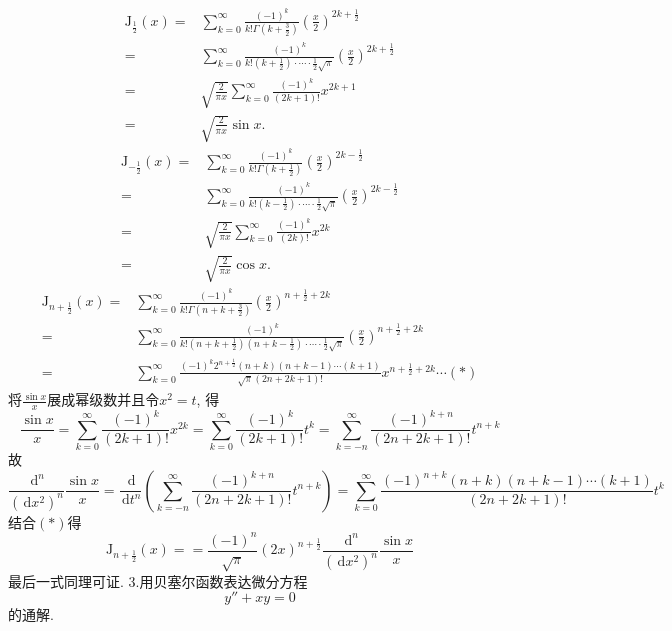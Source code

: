 \documentclass[titlepage,11pt,a4paper,twoside]{report}
\makeatletter
\newcommand\diff{\,\mathrm{d}}
\newcommand\rmJ{\mathrm{J}}
\renewenvironment{proof}{\par
	\pushQED{\qed}%
	\normalfont \topsep1\p@\@plus6\p@\relax
	\trivlist
	\item\relax
	{\hspace*{\parindent}{\heiti 证明}\@addpunct{:}}\hspace\labelsep\ignorespaces
}{%
	\popQED\endtrivlist\@endpefalse
}
\makeatother
\begin{document}
\begin{proof}\[\begin{split}
\rmJ_{\frac{1}{2}}(x)=&\sum_{k=0}^{\infty}\frac{(-1)^k}{k!\Gamma\left(k+\frac{3}{2}\right)}\left(\frac{x}{2}\right)^{2k+\frac{1}{2}}\\
=&\sum_{k=0}^{\infty}\frac{(-1)^k}{k!\left(k+\frac{1}{2}\right)\cdot\cdots\cdot\frac{1}{2}\sqrt{\pi}}\left(\frac{x}{2}\right)^{2k+\frac{1}{2}}\\
=&\sqrt{\frac{2}{\pi x}}\sum_{k=0}^{\infty}\frac{(-1)^k}{(2k+1)!}x^{2k+1}\\
=&\sqrt{\frac{2}{\pi x}}\sin x.
\end{split}\]
\[\begin{split}\rmJ_{-\frac{1}{2}}(x)=&\sum_{k=0}^{\infty}\frac{(-1)^k}{k!\Gamma\left(k+\frac{1}{2}\right)}\left(\frac{x}{2}\right)^{2k-\frac{1}{2}}\\
=&\sum_{k=0}^{\infty}\frac{(-1)^k}{k!\left(k-\frac{1}{2}\right)\cdot\cdots\cdot\frac{1}{2}\sqrt{\pi}}\left(\frac{x}{2}\right)^{2k-\frac{1}{2}}\\
=&\sqrt{\frac{2}{\pi x}}\sum_{k=0}^{\infty}\frac{(-1)^k}{(2k)!}x^{2k}\\
=&\sqrt{\frac{2}{\pi x}}\cos x.
\end{split}\]
\[\begin{split}
\rmJ_{n+\frac{1}{2}}(x)=&\sum_{k=0}^{\infty}\frac{(-1)^k}{k!\Gamma\left(n+k+\frac{3}{2}\right)}\left(\frac{x}{2}\right)^{n+\frac{1}{2}+2k}\\
=&\sum_{k=0}^{\infty}\frac{(-1)^k}{k!\left(n+k+\frac{1}{2}\right)\left(n+k-\frac{1}{2}\right)\cdot\cdots\cdot\frac{1}{2}\sqrt{\pi}}\left(\frac{x}{2}\right)^{n+\frac{1}{2}+2k}\\
=&\sum_{k=0}^{\infty}\frac{(-1)^k2^{n+\frac{1}{2}}(n+k)(n+k-1)\cdots(k+1)}{\sqrt{\pi}(2n+2k+1)!}x^{n+\frac{1}{2}+2k}\cdots(*)
\end{split}\]
将$\frac{\sin x}{x}$展成幂级数并且令$x^2=t$, 得
\[\frac{\sin x}{x}=\sum_{k=0}^{\infty}\frac{(-1)^k}{(2k+1)!}x^{2k}=\sum_{k=0}^{\infty}\frac{(-1)^k}{(2k+1)!}t^k=\sum_{k=-n}^{\infty}\frac{(-1)^{k+n}}{(2n+2k+1)!}t^{n+k}\]
故
\[\frac{\diff^n}{(\diff x^2)^n}\frac{\sin x}{x}=\frac{\diff}{\diff t^n}\left(\sum_{k=-n}^{\infty}\frac{(-1)^{k+n}}{(2n+2k+1)!}t^{n+k}\right)=\sum_{k=0}^{\infty}\frac{(-1)^{n+k}(n+k)(n+k-1)\cdots(k+1)}{(2n+2k+1)!}t^k\]
结合$(*)$得
\[\rmJ_{n+\frac{1}{2}}(x)==\frac{(-1)^n}{\sqrt{\pi}}(2x)^{n+\frac{1}{2}}\frac{\diff^n}{(\diff x^2)^n}\frac{\sin x}{x}\]
最后一式同理可证.
\end{proof}
3.用贝塞尔函数表达微分方程\[y''+xy=0\]的通解.
\end{document}
